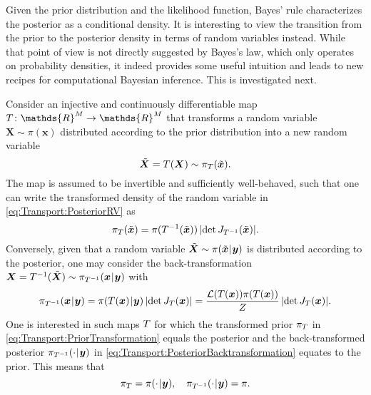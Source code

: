 Given the prior distribution and the likelihood function, Bayes' rule characterizes the posterior as a conditional density.
It is interesting to view the transition from the prior to the posterior density in terms of random variables instead.
While that point of view is not directly suggested by Bayes's law, which only operates on probability densities,
it indeed provides some useful intuition and leads to new recipes for computational Bayesian inference.
This is investigated next.
\par %
Consider an injective and continuously differentiable map \(\map \colon \mathds{R}^{\dimParam} \rightarrow \mathds{R}^{\dimParam}\) that transforms a random variable
\(\bm{X} \sim \pi(\bm{x})\) distributed according to the prior distribution into a new random variable
\begin{equation} \label{eq:Transport:PosteriorRV}
  \tilde{\bm{X}} = T(\bm{X}) \sim \pi_{T}(\tilde{\bm{x}}).
\end{equation}
The map is assumed to be invertible and sufficiently well-behaved, such that one can write the transformed density of the random variable in \cref{eq:Transport:PosteriorRV} as
\begin{equation} \label{eq:Transport:PriorTransformation}
  \pi_{T}(\tilde{\bm{x}})
  = \pi(T^{-1}(\tilde{\bm{x}})) \, \lvert \det J_{T^{-1}}(\tilde{\bm{x}}) \rvert.
\end{equation}
Conversely, given that a random variable \(\tilde{\bm{X}} \sim \pi(\tilde{\bm{x}} {\:\!}|{\:\!} \bm{y})\) is distributed according to the posterior,
one may consider the back-transformation \(\bm{X} = T^{-1}(\tilde{\bm{X}}) \sim \pi_{T^{-1}}(\bm{x} {\:\!}|{\:\!} \bm{y})\) with
\begin{equation} \label{eq:Transport:PosteriorBacktransformation}
  \pi_{T^{-1}}(\bm{x} {\:\!}|{\:\!} \bm{y})
  = \pi(T(\bm{x}) {\:\!}|{\:\!} \bm{y}) \, \lvert \det J_T(\bm{x}) \rvert
  = \frac{\mathcal{L}(T(\bm{x})) \pi(T(\bm{x}))}{Z} \, \lvert \det J_T(\bm{x}) \rvert.
\end{equation}
One is interested in such maps \(T\) for which the transformed prior \(\pi_{T}\) in \cref{eq:Transport:PriorTransformation} equals the posterior
and the back-transformed posterior \(\pi_{T^{-1}}(\cdot {\:\!}|{\:\!} \bm{y})\) in \cref{eq:Transport:PosteriorBacktransformation} equates to the prior.
This means that
\begin{equation} \label{eq:Transport:PriorPosteriorTransformation}
  \pi_{T} = \pi(\cdot {\:\!}|{\:\!} \bm{y}), \quad \pi_{T^{-1}}(\cdot {\:\!}|{\:\!} \bm{y}) = \pi.
\end{equation}
